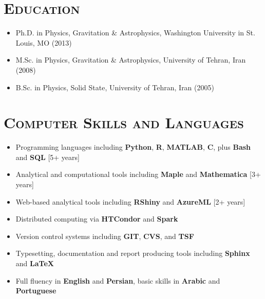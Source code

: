 \documentclass[10pt,a4paper]{moderncv}
\begin{document}
\section{\textsc{Education}}
\begin{itemize}
\item Ph.D. in Physics, Gravitation \& Astrophysics, Washington University in St. Louis, MO (2013)
\item M.Sc. in Physics, Gravitation \& Astrophysics, University of Tehran, Iran (2008)
\item B.Sc. in Physics, Solid State, University of Tehran, Iran (2005)
\end{itemize}


\section{\textsc{Computer Skills and Languages}}
\begin{itemize}
\item Programming languages including \textbf{Python}, \textbf{R}, \textbf{MATLAB}, \textbf{C}, plus \textbf{Bash} and \textbf{SQL} [5+ years]
\item Analytical and computational tools including \textbf{Maple} and \textbf{Mathematica} [3+ years]
\item Web-based analytical tools including \textbf{RShiny} and \textbf{AzureML} [2+ years]
\item Distributed computing via \textbf{HTCondor} and \textbf{Spark}
\item Version control systems including \textbf{GIT}, \textbf{CVS}, and \textbf{TSF}
\item Typesetting, documentation and report producing tools including \textbf{Sphinx} and \textbf{\LaTeX}
\vspace{.2cm}
\item Full fluency in \textbf{English} and \textbf{Persian}, basic skills in \textbf{Arabic} and \textbf{Portuguese}
\end{itemize}
\end{document}
